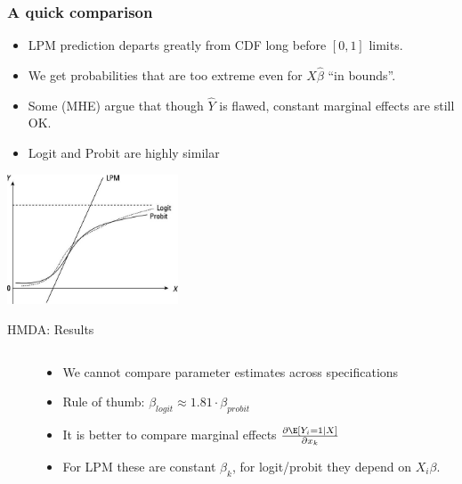 \documentclass[aspectratio=169,11pt]{beamer}
\begin{document}
\begin{frame}
\frametitle{A quick comparison}
\begin{itemize}
\item LPM prediction departs greatly from CDF long before $[0,1]$ limits.
\item We get probabilities that are too extreme even for $X\hat{\beta}$ ``in bounds''.
\item Some (MHE) argue that though $\hat{Y}$ is flawed, constant marginal effects are still OK.
\item Logit and Probit are highly similar
\end{itemize}
\begin{center}
\includegraphics[width=2in]{resources/lpm-probit.jpg}
\end{center}
\end{frame}



\begin{frame}{HMDA: Results}
\begin{columns}
\begin{column}{0.4\textwidth}
\begin{center}
\scalebox{0.55}{
    
   }
\end{center}
\end{column}
\begin{column}{0.52\textwidth}
\begin{itemize}
    \item We cannot compare parameter estimates across specifications
    \item Rule of thumb: $\beta_{logit} \approx  1.81 \cdot \beta_{probit}$
    \item It is better to compare marginal effects $\frac{\partial \E[Y_i=1 \mid X]}{\partial x_k}$
    \item For LPM these are constant $\beta_k$, for logit/probit they depend on $X_i \beta$.
\end{itemize}
\end{column}
\end{columns}
\end{frame}
\end{document}
